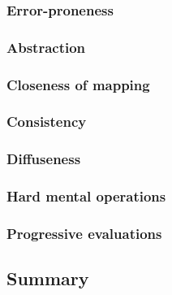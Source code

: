 \subsubsection[*]{Error-proneness}

\subsubsection[*]{Abstraction}

\subsubsection[*]{Closeness of mapping}

\subsubsection[*]{Consistency}

\subsubsection[*]{Diffuseness}

\subsubsection[*]{Hard mental operations}

\subsubsection[*]{Progressive evaluations}

\subsection{Summary}
